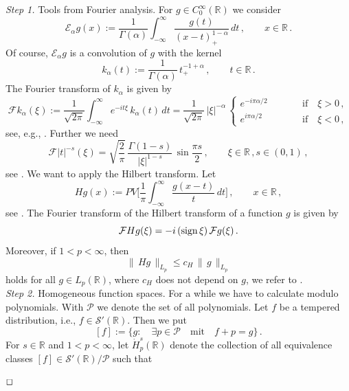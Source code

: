 \documentclass[12pt]{article}
\newenvironment{proof}{\begin{trivlist}
    \item[\hskip\labelsep{\it Proof.}]}{$\hfill\Box$\end{trivlist}}
\newcommand{\cs}{{\mathcal S}}
\newcommand{\cp}{{\mathcal P}}
\newcommand{\ce}{{\mathcal E}}
\newcommand{\re}{\mathbb{R}}
\newcommand{\cf}{{\mathcal{F}}}
\newcommand{\sign}{{\rm sign} \, }
\begin{document}
\begin{proof}
{\em Step 1.} Tools from Fourier  analysis.
For $g \in C_0^\infty (\re)$ we consider  
\[
\ce_\alpha g(x):= \frac{1}{\Gamma (\alpha)} \int_{-\infty}^\infty \frac{g(t)}{(x-t)_+^{1-\alpha}}\, dt\, , \qquad x \in \re \, .
\]
Of course,  $\ce_\alpha  g$ is a convolution of $g$ with the kernel 
\[
k_\alpha (t):= \frac{1}{\Gamma (\alpha)} \, t_+^{-1+\alpha}\, , \qquad t \in \re \, .
\]
The  Fourier transform of $k_\alpha $ is given by 
\begin{equation}\label{1}
\cf k_\alpha (\xi ) := \frac{1}{\sqrt{2\pi}} \int_{-\infty}^\infty e^{-it\xi}\, k_\alpha(t)\, dt
= \frac{1}{\sqrt{2\pi}} \, |\xi|^{-\alpha} \, \left\{
\begin{array}{lll}
e^{-i \pi \alpha/2} & \qquad & \mbox{if}\quad \xi>0\, , 
\\
e^{i \pi \alpha/2} & \qquad & \mbox{if}\quad \xi<0\, , 
\end{array}
\right.
\end{equation}
see, e.g., \cite[page 400]{BN}. 
Further we need 
\begin{equation}\label{2}
\cf |t|^{-s}(\xi) = \sqrt{\frac 2\pi} \, \frac{\Gamma (1-s)}{|\xi|^{1-s}} \, \sin \frac{\pi s}{2}\, , \qquad \xi \in \re \, , s\in (0,1)\,,
\end{equation}
see \cite[page 516]{BN}. We want to apply the Hilbert transform.
Let
\[
Hg (x) := PV \Big[\frac{1}{\pi} \int_{-\infty}^\infty \frac{g(x-t)}{t}\, dt
\Big]\, , \qquad x \in \re\, , 
\]
see \cite[page 306]{BN}.
The  Fourier transform of the  Hilbert transform of a function $g$ is given by 
\begin{equation}\label{3}
\cf H g(\xi)= -i \, (\sign \xi) \, \cf g (\xi)\, .
\end{equation}
Moreover, if $1 <p< \infty$, then  
\begin{equation}\label{4}
\| \, Hg \,\|_{L_p} \le c_H \, \| \, g \, \|_{L_p } 
\end{equation}
holds for all  $g \in L_p (\re)$, where $c_{H}$ does not depend on $g$, we refer to \cite[Thm.~8.1.12]{BN}.
\\
{\em Step 2.} Homogeneous function spaces. For a while we have to calculate modulo polynomials. 
With $\cp$ we denote the set of all polynomials. 
Let $f$ be a tempered distribution, i.e., $f \in \cs' (\re)$. Then we put
\[
[f] := \{g: \quad \exists p \in \cp \quad \mbox{mit}\quad f+p =g\}\, .
\]
For $s \in \re $ and $1 <p<\infty$, let  $\dot{H}^s_p (\re)$ denote the collection of all equivalence classes  $[f] \in \cs'(\re)/\cp$ such that 

\end{proof}
\end{document}

